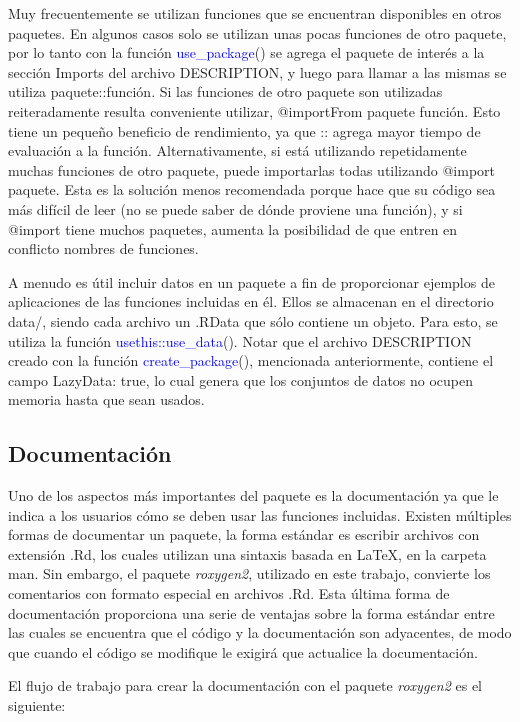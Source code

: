 Muy frecuentemente se utilizan funciones que se encuentran disponibles en otros paquetes. En algunos casos solo se utilizan unas pocas funciones de otro paquete, por lo tanto con la función \textcolor{blue}{use\_package}() se agrega el paquete de interés a la sección Imports del archivo DESCRIPTION, y luego para llamar a las mismas se utiliza paquete::función. Si las funciones de otro paquete son utilizadas reiteradamente resulta conveniente utilizar, @importFrom paquete función. Esto tiene un pequeño beneficio de rendimiento, ya que :: agrega mayor tiempo de evaluación a la función. Alternativamente, si está utilizando repetidamente muchas funciones de otro paquete, puede importarlas todas utilizando @import paquete. Esta es la solución menos recomendada porque hace que su código sea más difícil de leer (no se puede saber de dónde proviene una función), y si @import tiene muchos paquetes, aumenta la posibilidad de que entren en conflicto nombres de funciones.

A menudo es útil incluir datos en un paquete a fin de proporcionar ejemplos de aplicaciones de las funciones incluidas en él. Ellos se almacenan en el directorio data/, siendo cada archivo un .RData que sólo contiene un objeto. Para esto, se utiliza la función \textcolor{blue}{usethis::use\_data}(). Notar que el archivo DESCRIPTION creado con la función \textcolor{blue}{create\_package}(), mencionada anteriormente, contiene el campo LazyData: true, lo cual genera que los conjuntos de datos no ocupen memoria hasta que sean usados.

\subsection{Documentación}

Uno de los aspectos más importantes del paquete es la documentación ya que le indica a los usuarios cómo se deben usar las funciones incluidas. Existen múltiples formas de documentar un paquete, la forma estándar es escribir archivos con extensión .Rd, los cuales utilizan una sintaxis basada en LaTeX, en la carpeta man. Sin embargo, el paquete \emph{roxygen2}, utilizado en este trabajo, convierte los comentarios con formato especial en archivos .Rd. Esta última forma de documentación proporciona una serie de ventajas sobre la forma estándar entre las cuales se encuentra que el código y la documentación son adyacentes, de modo que cuando el código se modifique le exigirá que actualice la documentación. 

El flujo de trabajo para crear la documentación con el paquete \emph{roxygen2} es el siguiente:

